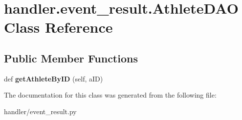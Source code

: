 \hypertarget{classhandler_1_1event__result_1_1_athlete_d_a_o}{}\section{handler.\+event\+\_\+result.\+Athlete\+D\+AO Class Reference}
\label{classhandler_1_1event__result_1_1_athlete_d_a_o}
\subsection*{Public Member Functions}
\begin{DoxyCompactItemize}
\item 
\mbox{\label{classhandler_1_1event__result_1_1_athlete_d_a_o_aae79d4ba7911c0735b204753c19ad663}} 
def {\bfseries get\+Athlete\+By\+ID} (self, a\+ID)
\end{DoxyCompactItemize}


The documentation for this class was generated from the following file\+:\begin{DoxyCompactItemize}
\item 
handler/event\+\_\+result.\+py\end{DoxyCompactItemize}
